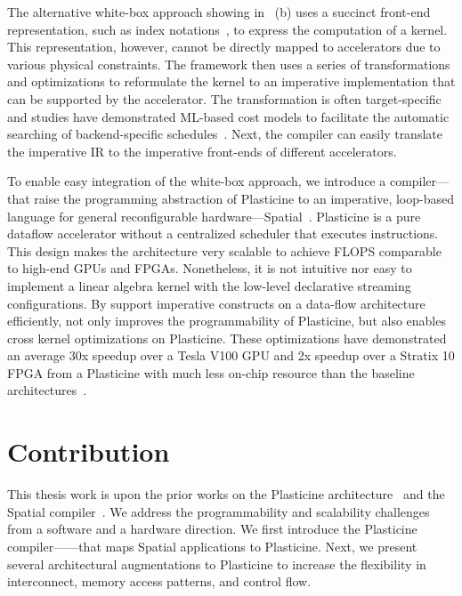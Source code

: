 The alternative white-box approach showing in~ (b) uses a succinct front-end
representation, such as index notations~\cite{taco}, to express the computation of a kernel.
This representation, however, cannot be directly mapped to accelerators due to various physical
constraints.
The framework then uses a series of transformations and optimizations to reformulate the kernel to an imperative implementation that can be supported by the accelerator. 
The transformation is often target-specific and studies have demonstrated ML-based cost models to
facilitate the automatic searching of backend-specific schedules~\cite{tvm}.
Next, the compiler can easily translate the imperative IR to the imperative front-ends of different
accelerators.

To enable easy integration of the white-box approach, we introduce a compiler--\name--that raise
the programming abstraction of Plasticine to an imperative, loop-based
language for general reconfigurable hardware---Spatial~\cite{spatial}.
Plasticine is a pure dataflow accelerator without a centralized scheduler that
executes instructions. This design makes the architecture very scalable to achieve FLOPS comparable
to high-end GPUs and FPGAs.
Nonetheless, it is not intuitive nor easy to implement a linear algebra kernel with the low-level
declarative streaming configurations.
By support imperative constructs on a data-flow architecture efficiently, \name not only improves the programmability of Plasticine, but also enables cross kernel optimizations on Plasticine.
These optimizations have demonstrated an average 30x speedup over a Tesla V100 GPU and 2x speedup over
a Stratix 10 FPGA from a Plasticine with much less on-chip resource than the baseline architectures~\cite{tz_rnn}.

\section{Contribution}

This thesis work is upon the prior works on the Plasticine architecture~\cite{plasticine} and the Spatial
compiler~\cite{spatial}.
We address the programmability and scalability challenges from a software
and a hardware direction.
We first introduce the Plasticine compiler---\name---that maps Spatial applications to Plasticine.
Next, we present several architectural augmentations to Plasticine to increase the flexibility in interconnect, memory access patterns, and control flow.

